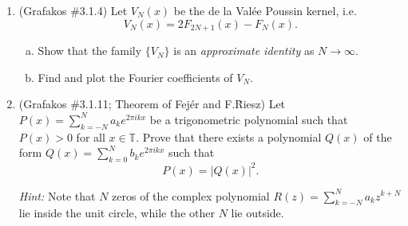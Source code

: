 \documentclass[a4paper]{article}
\begin{document}
\begin{enumerate}
\begin{proof}
\begin{enumerate}
      Therefore,
      \begin{align*}
        F_N(x) &= \sum_{n=0}^N D_n(x) \\
        &= \sum_{n=0}^N \frac{\sin \left( (2n+1) \pi x \right)}{\sin (\pi x)} \\
        &= \sum_{n=0}^N \frac{\sin \left( (2n+1) \pi x \right) \sin ( \pi x )}{\sin^2 (\pi x)} \\
        &= \left( \frac{\sin \left( (N+1) \pi x \right)}{\sin (\pi x)} \right)^2 \quad \text{by \eqref{eqn:trig_prod}}
      \end{align*}

    \item
  \end{enumerate}<++>

\end{proof}

\item  (Grafakos \#3.1.4) Let $V_N (x)$ be the de la Val\'{e}e Poussin   kernel, i.e. $$ V_N (x) = 2 F_{2N+1} (x) - F_N (x). $$

\begin{enumerate}[(a)]
\item Show that the family $\{ V_N \}$ is an {\it{approximate identity}} as $N\rightarrow \infty$.
\item Find and plot the Fourier coefficients of $V_N$.
\end{enumerate}
\item  (Grafakos \#3.1.11; Theorem of Fej\'er and F.\~Riesz)  Let $\displaystyle{ P(x) = \sum_{k=-N}^N a_k e^{2\pi i k x} }$ be a trigonometric polynomial such that $ P(x) > 0$ for all $x\in \mathbb T$. Prove that there exists a polynomial  $Q(x)$ of the form  $\displaystyle{ Q(x) = \sum_{k=0}^N b_k e^{2\pi i k x} }$ such that $$P (x) = | Q(x) |^2 . $$

{\it{Hint:}}  Note that $N$ zeros of the complex polynomial   $\displaystyle{ R(z) = \sum_{k=-N}^N a_k z^{k+N} }$ lie inside the unit circle, while the other $N$ lie outside.

\end{enumerate}
\end{document}
